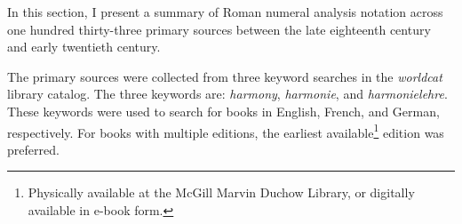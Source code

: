 

In this section, I present a summary of Roman numeral analysis notation across one hundred thirty-three primary sources between the late eighteenth century and early twentieth century.

The primary sources were collected from three keyword searches in the \emph{worldcat} library catalog.
The three keywords are: \emph{harmony}, \emph{harmonie}, and \emph{harmonielehre}.
These keywords were used to search for books in English, French, and German, respectively.
For books with multiple editions, the earliest available\footnote{Physically available at the McGill Marvin Duchow Library, or digitally available in e-book form.} edition was preferred.


